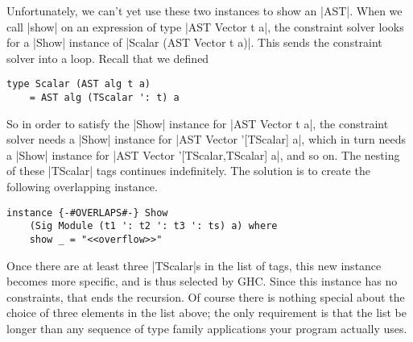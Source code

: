 \documentclass[preprint]{sigplanconf}
\theoremstyle{definition}
\begin{document}
Unfortunately, we can't yet use these two instances to show an |AST|.
When we call |show| on an expression of type |AST Vector t a|,
the constraint solver looks for a |Show| instance of |Scalar (AST Vector t a)|.
This sends the constraint solver into a loop.
Recall that we defined
\begin{lstlisting}
type Scalar (AST alg t a)
    = AST alg (TScalar ': t) a
\end{lstlisting}
So in order to satisfy the |Show| instance for |AST Vector t a|,
the constraint solver needs a |Show| instance for |AST Vector '[TScalar] a|,
which in turn needs a |Show| instance for |AST Vector '[TScalar,TScalar] a|,
and so on.
The nesting of these |TScalar| tags continues indefinitely.
The solution is to create the following overlapping instance.
\begin{lstlisting}
instance {-#OVERLAPS#-} Show
    (Sig Module (t1 ': t2 ': t3 ': ts) a) where
    show _ = "<<overflow>>"
\end{lstlisting}
Once there are at least three |TScalar|s in the list of tags,
this new instance becomes more specific,
and is thus selected by GHC.
Since this instance has no constraints,
that ends the recursion.
Of course there is nothing special about the choice of three elements in the list above;
the only requirement is that the list be longer than any sequence of type family applications your program actually uses.
\end{document}
